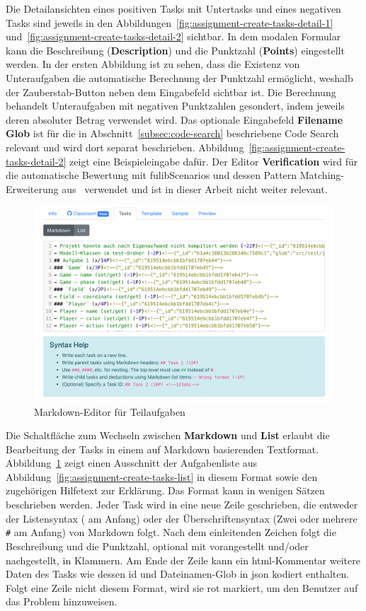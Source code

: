 Die Detailansichten eines positiven Tasks mit Untertasks und eines negativen Tasks sind jeweils in den Abbildungen~\ref{fig:assignment-create-tasks-detail-1} und~\ref{fig:assignment-create-tasks-detail-2} sichtbar.
In dem modalen Formular kann die Beschreibung (\textbf{Description}) und die Punktzahl (\textbf{Points}) eingestellt werden.
In der ersten Abbildung ist zu sehen, dass die Existenz von Unteraufgaben die automatische Berechnung der Punktzahl ermöglicht, weshalb der Zauberstab-Button neben dem Eingabefeld sichtbar ist.
Die Berechnung behandelt Unteraufgaben mit negativen Punktzahlen gesondert, indem jeweils deren absoluter Betrag verwendet wird.
Das optionale Eingabefeld \textbf{Filename Glob} ist für die in Abschnitt~\ref{subsec:code-search} beschriebene Code Search relevant und wird dort separat beschrieben.
Abbildung~\ref{fig:assignment-create-tasks-detail-2} zeigt eine Beispieleingabe dafür.
Der Editor \textbf{Verification} wird für die automatische Bewertung mit fulibScenarios und dessen Pattern Matching-Erweiterung aus~\cite{bachelor-thesis} verwendet und ist in dieser Arbeit nicht weiter relevant.

\begin{figure}
    \centering
    \includegraphics[width=\textwidth]{images/assignment-create-tasks-markdown}
    \caption{Markdown-Editor für Teilaufgaben}
    \label{fig:assignment-create-tasks-markdown}
\end{figure}

Die Schaltfläche zum Wechseln zwischen \textbf{Markdown} und \textbf{List} erlaubt die Bearbeitung der Tasks in einem auf Markdown basierenden Textformat.
Abbildung~\ref{fig:assignment-create-tasks-markdown} zeigt einen Ausschnitt der Aufgabenliste aus Abbildung~\ref{fig:assignment-create-tasks-list} in diesem Format sowie den zugehörigen Hilfetext zur Erklärung.
Das Format kann in wenigen Sätzen beschrieben werden.
Jeder Task wird in eine neue Zeile geschrieben, die entweder der Listensyntax (\code{-} am Anfang) oder der Überschriftensyntax (Zwei oder mehrere \texttt{\#} am Anfang) von Markdown folgt.
Nach dem einleitenden Zeichen folgt die Beschreibung und die Punktzahl, optional mit  vorangestellt und/oder  nachgestellt, in Klammern.
Am Ende der Zeile kann ein \ac{html}-Kommentar weitere Daten des Tasks wie dessen \ac{id} und Dateinamen-Glob in \ac{json} kodiert enthalten.
Folgt eine Zeile nicht diesem Format, wird sie rot markiert, um den Benutzer auf das Problem hinzuweisen.


